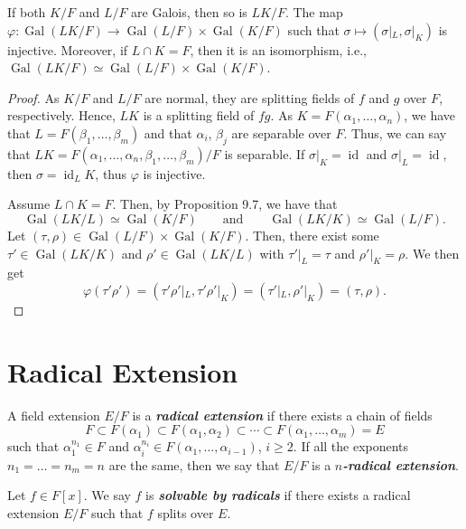 \documentclass[twoside]{article}
\DeclareMathOperator\Gal{Gal}
\DeclareMathOperator\id{id}
\theoremstyle{remark}
\newcommand*\term[1]{\textbf{\textit{\mathversion{bold}#1}}}
\begin{document}
\begin{proposition}
  If both \(K/F\) and \(L/F\) are Galois, then so is \(LK/F\). The map \(\varphi\colon \Gal(LK/F) \to \Gal(L/F) \times \Gal(K/F)\) such that \(\sigma \mapsto (\sigma|_L, \sigma|_K)\) is injective. Moreover, if \(L \cap K = F\), then it is an isomorphism, i.e., \(\Gal(LK/F) \simeq \Gal(L/F) \times \Gal(K/F)\).
\end{proposition}

\begin{proof}
  As \(K/F\) and \(L/F\) are normal, they are splitting fields of \(f\) and \(g\) over \(F\), respectively. Hence, \(LK\) is a splitting field of \(fg\). As \(K = F(\alpha_1, \dots, \alpha_n)\), we have that \(L = F(\beta_1, \dots, \beta_m)\) and that \(\alpha_i\), \(\beta_j\) are separable over \(F\). Thus, we can say that \(LK = F(\alpha_1, \dots, \alpha_n, \beta_1, \dots, \beta_m)/F\) is separable. If \(\sigma|_K = \id\) and \(\sigma|_L = \id\), then \(\sigma = \id_LK\), thus \(\varphi\) is injective.
  
  Assume \(L \cap K = F\). Then, by Proposition 9.7, we have that
  \[ \Gal(LK/L) \simeq \Gal(K/F) \qquad \text{and} \qquad \Gal(LK/K) \simeq \Gal(L/F). \]
  Let \((\tau,\rho) \in \Gal(L/F) \times \Gal(K/F)\). Then, there exist some \(\tau' \in \Gal(LK/K)\) and \(\rho' \in \Gal(LK/L)\) with \(\tau'|_L = \tau\) and \(\rho'|_K = \rho\). We then get
  \[ \varphi(\tau'\rho') = (\tau'\rho'|_L, \tau'\rho'|_K) = (\tau'|_L, \rho'|_K) = (\tau, \rho). \]
\end{proof}

\section{Radical Extension}

\begin{definition}%
  A field extension \(E/F\) is a \term{radical extension} if there exists a chain of fields
  \[ F \subset F(\alpha_1) \subset F(\alpha_1, \alpha_2) \subset \cdots \subset F(\alpha_1, \dots, \alpha_m) = E \]
  such that \(\alpha_1^{n_1} \in F\) and \(\alpha_i^{n_i} \in F(\alpha_1, \dots, \alpha_{i-1})\), \(i \geq 2\). If all the exponents \(n_1 = \dots = n_m = n\) are the same, then we say that \(E/F\) is a \term{\(n\)-radical extension}.
\end{definition}

\begin{definition}
  Let \(f \in F[x]\). We say \(f\) is \term{solvable by radicals} if there exists a radical extension \(E/F\) such that \(f\) splits over \(E\).
\end{definition}
\end{document}
